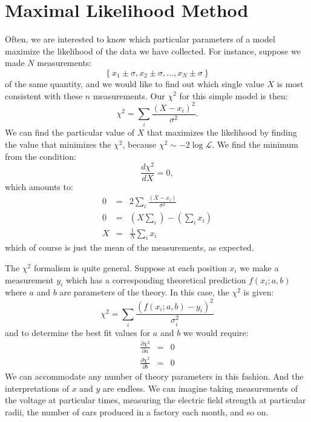 \documentclass[12pt,oneside]{book}
\begin{document}
\section{Maximal Likelihood Method}

Often, we are interested to know which particular parameters of a model maximize the likelihood
of the data we have collected.  For instance, suppose we made $N$ measurements:
\begin{displaymath}
\left\{ x_1 \pm \sigma, x_2 \pm \sigma, ..., x_N \pm \sigma \right\}
\end{displaymath}
of the same quantity, and we would like to find out which single value $X$ is most consistent with these $n$ measurements.  Our $\chi^2$ for this simple model is then:
\begin{displaymath}
\chi^2 = \sum_i \frac{(X - x_i)^2}{\sigma^2}.
\end{displaymath}
We can find the particular value of $X$ that maximizes the likelihood by finding the value that minimizes the $\chi^2$, because $\chi^2 \sim - 2 \log \mathcal{L}$.  We find the minimum from the condition:
\begin{displaymath}
\frac{d\chi^2}{dX} = 0,
\end{displaymath}
which amounts to:
\begin{eqnarray}
0 &=& 2 \sum_i \frac{(X - x_i)}{\sigma^2} \nonumber \\
0 &=& \left( X \sum_i \right)- \left( \sum_i x_i \right) \nonumber \\
X &=& \frac{1}{N} \sum_i x_i \label{eqn:mean}
\end{eqnarray}
which of course is just the mean of the measurements, as expected.

The $\chi^2$ formalism is quite general.  Suppose at each position $x_i$ we make a measurement $y_i$ which has a corresponding theoretical prediction $f(x_i; a, b)$ where $a$ and $b$ are parameters of the theory.  In this case, the $\chi^2$ is given:
\begin{displaymath}
\chi^2 = \sum_i \frac{(f(x_i;a,b) - y_i)^2}{\sigma_i^2}
\end{displaymath}
and to determine the best fit values for $a$ and $b$ we would require:
\begin{eqnarray*}
\frac{\partial \chi^2}{\partial a} &=& 0 \\
\frac{\partial \chi^2}{\partial b} &=& 0 
\end{eqnarray*}
We can accommodate any number of theory parameters in this fashion.  And the interpretations of $x$ and $y$ are endless.  We can imagine taking measurements of the voltage at particular times, measuring the electric field strength at particular radii, the number of cars produced in a factory each month, and so on.
\end{document}
